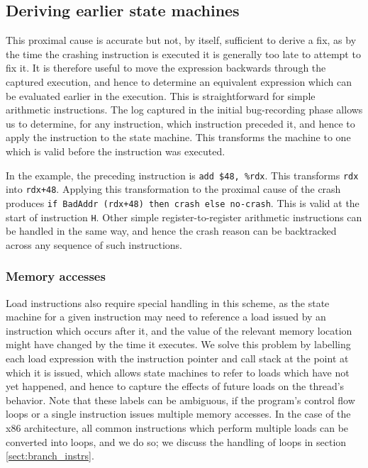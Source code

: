 \documentclass[10pt,twocolumn,preprint,natbib,authoryear]{sigplanconf}
\begin{document}
\subsection{Deriving earlier state machines}
This proximal cause is accurate but not, by itself, sufficient to
derive a fix, as by the time the crashing instruction is executed it
is generally too late to attempt to fix it.  It is therefore useful to
move the expression backwards through the captured execution, and
hence to determine an equivalent expression which can be evaluated
earlier in the execution.  This is straightforward for simple
arithmetic instructions.  The log captured in the initial
bug-recording phase allows us to determine, for any instruction, which
instruction preceded it, and hence to apply the instruction to the
state machine.  This transforms the machine to one which is valid
before the instruction was executed.

In the example, the preceding instruction is \verb|add $48, %rdx|.
This transforms \verb|rdx| into \verb|rdx+48|.  Applying this
transformation to the proximal cause of the crash produces
\verb|if BadAddr (rdx+48) then crash else no-crash|.  This is valid at
the start of instruction \verb|H|.  Other simple register-to-register
arithmetic instructions can be handled in the same way, and hence the
crash reason can be backtracked across any sequence of such
instructions.

\subsubsection{Memory accesses}

Load instructions also require special handling in this scheme, as the
state machine for a given instruction may need to reference a load
issued by an instruction which occurs after it, and the value of the
relevant memory location might have changed by the time it executes.
We solve this problem by labelling each load expression with the
instruction pointer and call stack at the point at which it is issued,
which allows state machines to refer to loads which have not yet
happened, and hence to capture the effects of future loads on the
thread's behavior.  Note that these labels can be ambiguous, if the
program's control flow loops or a single instruction issues multiple
memory accesses.  In the case of the x86 architecture, all common
instructions which perform multiple loads can be converted into loops,
and we do so; we discuss the handling of loops in section
\ref{sect:branch_instrs}.
\end{document}
